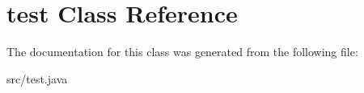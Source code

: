\hypertarget{classtest}{\section{test Class Reference}
\label{classtest}
}


The documentation for this class was generated from the following file\-:\begin{DoxyCompactItemize}
\item 
src/test.\-java\end{DoxyCompactItemize}
